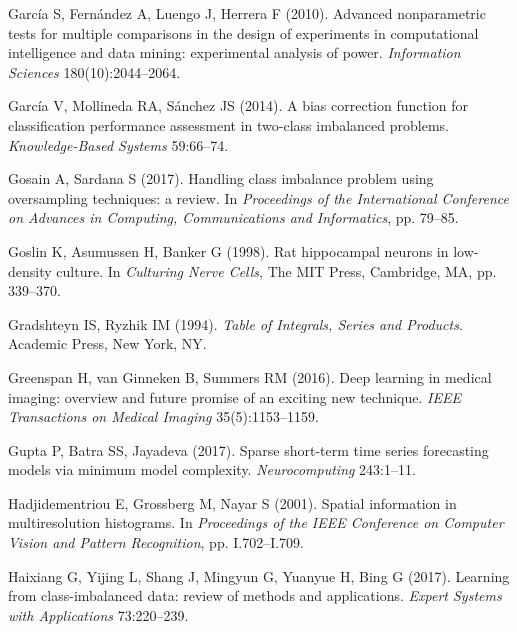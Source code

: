 \begin{thebibliography}{110}
Garc{\'i}a S, Fern{\'a}ndez A, Luengo J, Herrera F (2010). Advanced
  nonparametric tests for multiple comparisons in the design of experiments in
  computational intelligence and data mining: experimental analysis of power.
  \emph{Information Sciences} 180(10):2044--2064.

Garc{\'i}a V, Mollineda RA, S{\'{a}}nchez JS (2014). A bias correction function
  for classification performance assessment in two-class imbalanced problems.
  \emph{Knowledge-Based Systems} 59:66--74.

{\color{red}Gosain A, Sardana S (2017). Handling class imbalance problem using oversampling
  techniques: a review. In \emph{Proceedings of the International Conference on
  Advances in Computing, Communications and Informatics}, pp. 79--85.}

Goslin K, Asumussen H, Banker G (1998). Rat hippocampal neurons in low-density
  culture. In \emph{Culturing Nerve Cells}, The MIT Press, Cambridge, MA, pp.
  339--370.

Gradshteyn IS, Ryzhik IM (1994). \emph{Table of Integrals, Series and
  Products}. Academic Press, New York, NY.

Greenspan H, van Ginneken B, Summers RM (2016). Deep learning in medical
  imaging: overview and future promise of an exciting new technique. \emph{IEEE
  Transactions on Medical Imaging} 35(5):1153--1159.

Gupta P, Batra SS, Jayadeva (2017). Sparse short-term time series forecasting
  models via minimum model complexity. \emph{Neurocomputing} 243:1--11.

Hadjidementriou E, Grossberg M, Nayar S (2001). Spatial information in
  multiresolution histograms. In \emph{Proceedings of the IEEE Conference on
  Computer Vision and Pattern Recognition}, pp. I.702--I.709.

Haixiang G, Yijing L, Shang J, Mingyun G, Yuanyue H, Bing G (2017). Learning
  from class-imbalanced data: review of methods and applications. \emph{Expert
  Systems with Applications} 73:220--239.


\end{thebibliography}

